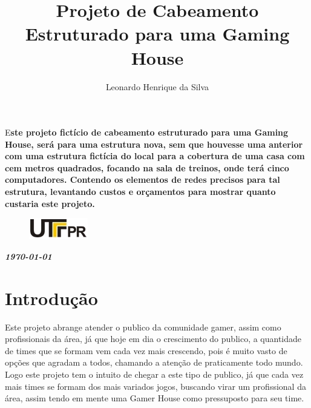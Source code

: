 \documentclass[	DIV=calc,%
							paper=a4,%
							fontsize=12pt,%
							onecolumn]{scrartcl}	 					%
\title{Projeto de Cabeamento Estruturado para uma Gaming House}					%
\author{Leonardo Henrique da Silva }  	%
\date{}																				%
\newcommand{\initial}[1]{%
     \lettrine[lines=3,lhang=0.3,nindent=0em]{
     				\color{DarkGoldenrod}
     				{\textsf{#1}}}{}}
\begin{document}
\maketitle
\thispagestyle{fancy} 	
\thispagestyle{empty}		%





\initial{E}\textbf{ste projeto fictício de cabeamento estruturado para uma Gaming House, será para uma estrutura nova, sem que houvesse uma anterior com uma estrutura fictícia do local para a cobertura de uma casa com cem metros quadrados, focando na sala de treinos, onde terá cinco computadores. Contendo os elementos de redes precisos para tal estrutura, levantando custos e orçamentos para mostrar quanto custaria este projeto.}


\begin{figure}
	\centering
	\includegraphics{utfpr}
\end{figure}

\vspace{2cm}
\centerline{\textit{\textbf{\today}}}

\clearpage
    \renewcommand*\listfigurename{Lista de figuras}
\listoffigures

\renewcommand*\listtablename{Lista de tabelas}
\listoftables




\clearpage
\renewcommand{\contentsname}{Sumário}
\tableofcontents
\clearpage

\section{Introdução}
	Este projeto abrange atender o publico da comunidade gamer, assim como profissionais da área, já que hoje em dia o crescimento do publico, a quantidade de times que se formam vem cada vez mais crescendo, pois é muito vasto de opções que agradam a todos, chamando a atenção de praticamente todo mundo. Logo este projeto tem o intuito de chegar a este tipo de publico, já que cada vez mais times se formam dos mais variados jogos, buscando virar um profissional da área, assim tendo em mente uma Gamer House como pressuposto para seu time.
\end{document}
